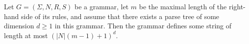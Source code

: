 \documentclass[runningheads]{llncs}
\begin{document}
\begin{lemma}\label{lem_caterpillars}
%
Let $G=(\Sigma, N, R, S)$ be a grammar,
let $m$ %
be the maximal length of the right-hand side of its rules,
and assume that there exists a parse tree of some dimension $d \geqslant 1$ in this grammar.
Then the grammar defines some string
of length at most $(|N|(m-1) + 1)^d$.
\end{lemma}
\end{document}
